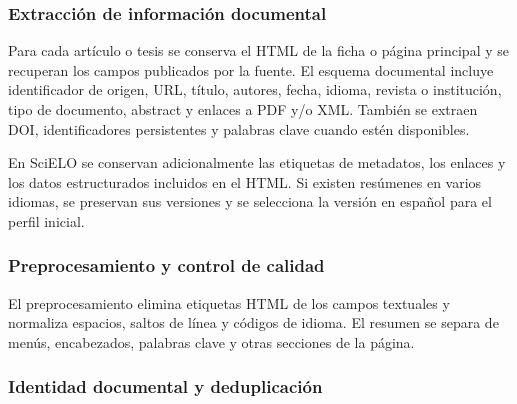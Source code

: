 \documentclass[conference]{IEEEtran}
\begin{document}
\subsubsection{Extracción de información documental}

Para cada artículo o tesis se conserva el HTML de la ficha o página principal y se recuperan los campos publicados por la fuente. El esquema documental incluye identificador de origen, URL, título, autores, fecha, idioma, revista o institución, tipo de documento, abstract y enlaces a PDF y/o XML. También se extraen DOI, identificadores persistentes y palabras clave cuando estén disponibles.


En SciELO se conservan adicionalmente las etiquetas de metadatos, los enlaces y los datos estructurados incluidos en el HTML. Si existen resúmenes en varios idiomas, se preservan sus versiones y se selecciona la versión en español para el perfil inicial. 


\subsubsection{Preprocesamiento y control de calidad}

El preprocesamiento elimina etiquetas HTML de los campos textuales y normaliza espacios, saltos de línea y códigos de idioma. El resumen se separa de menús, encabezados, palabras clave y otras secciones de la página. 


\subsubsection{Identidad documental y deduplicación}
\end{document}
